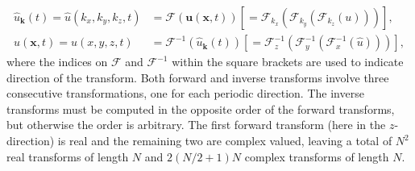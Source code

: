 \documentclass[11pt, oneside]{article}
\begin{document}
\begin{align}
\hat{u}_{\bm{k}}(t) = \hat{{u}}(k_x, k_y, k_z, t) &= \mathcal{F}(\bm{u}(\bm{x}, t)) \left[= \mathcal{F}_{k_x} \left(\mathcal{F}_{k_y} \left( \mathcal{F}_{k_z} ({u}) \right) \right) \right], \label{eq:fft}\\
{u}(\bm{x}, t) = {u}(x, y, z, t) &= \mathcal{F}^{-1}(\hat{{u}}_{\bm{k}}(t)) \left[= \mathcal{F}^{-1}_{z}\left(\mathcal{F}^{-1}_{y}\left(\mathcal{F}^{-1}_{x}(\hat{{u}})\right)\right)\right], \label{eq:ifft}
\end{align}
where the indices on $\mathcal{F}$ and $\mathcal{F}^{-1}$ within the square brackets are used to indicate direction of the transform. Both forward and inverse transforms involve three consecutive transformations, one for each periodic direction. The inverse transforms must be computed in the opposite order of the forward transforms, but otherwise the order is arbitrary. The first forward transform (here in the $z$-direction) is real and the remaining two are complex valued, leaving a total of $N^2$ real transforms of length $N$ and $2(N/2+1)N$ complex transforms of length $N$. 

\end{document}
